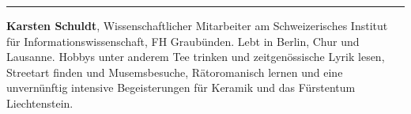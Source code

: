 \begin{center}\rule{0.5\linewidth}{0.5pt}\end{center}

\textbf{Karsten Schuldt}, Wissenschaftlicher Mitarbeiter am
Schweizerisches Institut für Informationswissenschaft, FH Graubünden.
Lebt in Berlin, Chur und Lausanne. Hobbys unter anderem Tee trinken und
zeitgenössische Lyrik lesen, Streetart finden und Musemsbesuche,
Rätoromanisch lernen und eine unvernünftig intensive Begeisterungen für
Keramik und das Fürstentum Liechtenstein.
